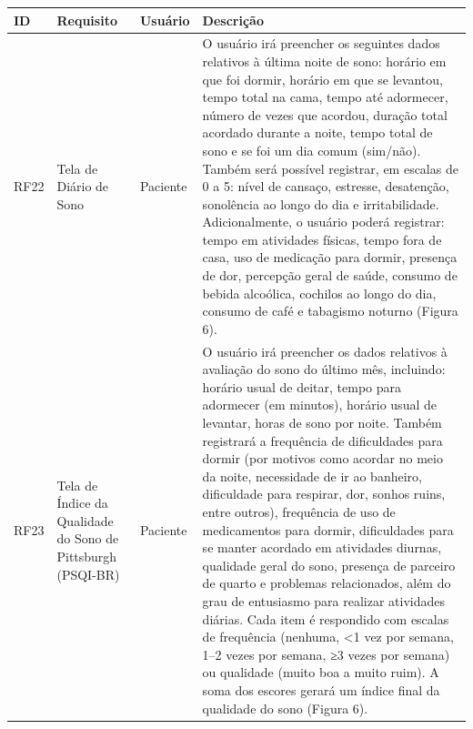 \href{}{}\documentclass[12pt,portuguese,oneside]{article}
\begin{document}
\begin{table}[H]
\centering
{}
\begin{tabularx}{\textwidth}{|>{\raggedright\arraybackslash}p{1cm}|>{\raggedright\arraybackslash}p{3cm}|>{\raggedright\arraybackslash}p{2cm}|>{\raggedright\arraybackslash}X|}
\hline
\rowcolor{gray!20}
\textbf{ID} & \textbf{Requisito} & \textbf{Usuário} & \textbf{Descrição}\\
\hline
RF22 & Tela de Diário de Sono & Paciente & O usuário irá preencher os seguintes dados relativos à última noite de sono: horário em que foi dormir, horário em que se levantou, tempo total na cama, tempo até adormecer, número de vezes que acordou, duração total acordado durante a noite, tempo total de sono e se foi um dia comum (sim/não). Também será possível registrar, em escalas de 0 a 5: nível de cansaço, estresse, desatenção, sonolência ao longo do dia e irritabilidade. Adicionalmente, o usuário poderá registrar: tempo em atividades físicas, tempo fora de casa, uso de medicação para dormir, presença de dor, percepção geral de saúde, consumo de bebida alcoólica, cochilos ao longo do dia, consumo de café e tabagismo noturno (Figura 6).\\
\hline
RF23 & Tela de Índice da Qualidade do Sono de Pittsburgh (PSQI-BR) & Paciente &
O usuário irá preencher os dados relativos à avaliação do sono do último mês, incluindo: horário usual de deitar, tempo para adormecer (em minutos), horário usual de levantar, horas de sono por noite. Também registrará a frequência de dificuldades para dormir (por motivos como acordar no meio da noite, necessidade de ir ao banheiro, dificuldade para respirar, dor, sonhos ruins, entre outros), frequência de uso de medicamentos para dormir, dificuldades para se manter acordado em atividades diurnas, qualidade geral do sono, presença de parceiro de quarto e problemas relacionados, além do grau de entusiasmo para realizar atividades diárias. Cada item é respondido com escalas de frequência (nenhuma, <1 vez por semana, 1–2 vezes por semana, ≥3 vezes por semana) ou qualidade (muito boa a muito ruim). A soma dos escores gerará um índice final da qualidade do sono (Figura 6).\\
\hline
\end{tabularx}
\end{table}

\newpage
\end{document}
